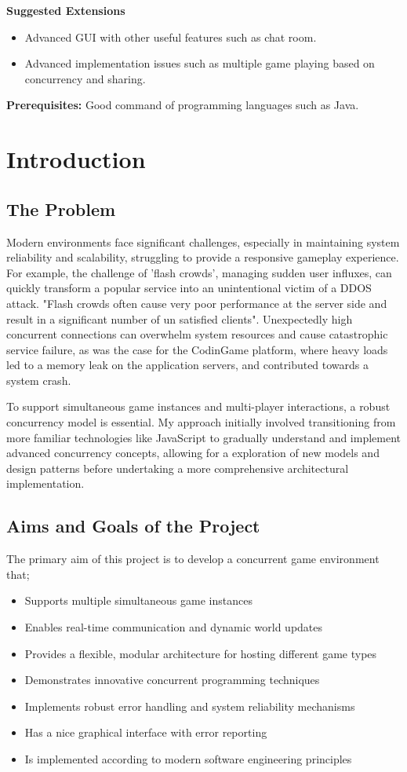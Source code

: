 \documentclass[]{interim}
\begin{document}
\textbf{Suggested Extensions}
\begin{itemize}
  \item Advanced GUI with other useful features such as chat room.
  \item Advanced implementation issues such as multiple game playing based on concurrency and sharing.
\end{itemize}

\textbf{Prerequisites:} Good command of programming languages such as Java.


\chapter{Introduction}
\section{The Problem}
Modern environments face significant challenges, especially in maintaining
system reliability and scalability, struggling to provide a responsive gameplay
experience. For example, the challenge of 'flash crowds', managing sudden user influxes,
can quickly transform a popular service into an unintentional victim of a
DDOS attack. "Flash crowds often cause very poor performance
at the server side and result in a significant number of un
satisfied clients"\cite{Ari_crss_nodate}. Unexpectedly high concurrent connections can overwhelm
system resources and cause catastrophic service failure, as was the case for
the CodinGame platform, where heavy loads led to a memory leak on the application
servers, and contributed towards a system crash\cite{jobert_story_2017}.

To support simultaneous game instances and multi-player interactions,
a robust concurrency model is essential. My approach initially involved
transitioning from more familiar technologies like JavaScript to
gradually understand and implement advanced concurrency concepts,
allowing for a exploration of new models and design patterns before
undertaking a more comprehensive architectural implementation.

\section{Aims and Goals of the Project}
The primary aim of this project is to develop a concurrent game environment that;
\begin{itemize}
  \item Supports multiple simultaneous game instances
  \item Enables real-time communication and dynamic world updates
  \item Provides a flexible, modular architecture for hosting different game types
  \item Demonstrates innovative concurrent programming techniques
  \item Implements robust error handling and system reliability mechanisms
  \item Has a nice graphical interface with error reporting
  \item Is implemented according to modern software engineering principles
\end{itemize}
\end{document}
